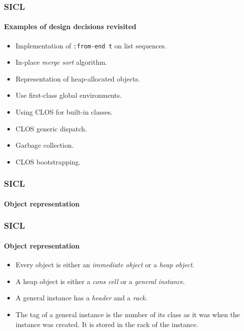 \documentclass{beamer}
\def\inputfig#1{}
\begin{document}
\begin{frame}
  \frametitle{SICL}
  \framesubtitle{Examples of design decisions revisited}

  \begin{itemize}
  \item Implementation of \texttt{:from-end t} on list sequences.
  \item In-place \emph{merge sort} algorithm. 
  \item Representation of heap-allocated objects.
  \item Use first-class global environments.
  \item Using CLOS for built-in classes.
  \item CLOS generic dispatch.
  \item Garbage collection.
  \item CLOS bootstrapping.
  \end{itemize}
\end{frame}
\begin{frame}
  \frametitle{SICL}
  \framesubtitle{Object representation}
  \begin{center}
\inputfig{fig-representation.pdf_t}
  \end{center}

\end{frame}
\begin{frame}
  \frametitle{SICL}
  \framesubtitle{Object representation}

  \begin{itemize}
  \item Every object is either an \emph{immediate object} or a
    \emph{heap object}.
  \item A heap object is either a \emph{cons cell} or a \emph{general
    instance}.
  \item A general instance has a \emph{header} and a \emph{rack}.
  \item The tag of a general instance is the number of its class as it
    was when the instance was created.  It is stored in the rack of
    the instance.
  \end{itemize}

\end{frame}
\end{document}
